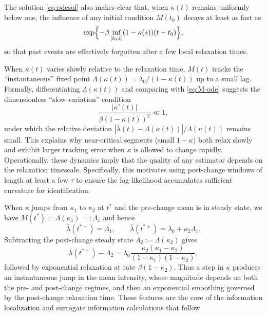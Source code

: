 \documentclass{article}
\theoremstyle{plain}
\theoremstyle{definition}
\newcommand{\1}{\mathbf{1}}
\begin{document}
    
    The solution \eqref{eq:odesol} also makes clear that, when $\kappa(t)$ remains uniformly below one, the influence of any initial condition $M(t_0)$ decays at least as fast as 
    \[
    \exp\Bigl\{-\beta\inf_{[t_0,t]}(1-\kappa(s))(t-t_0)\Bigr\},
    \]
    so that past events are effectively forgotten after a few local relaxation times.
    
    When $\kappa(t)$ varies slowly relative to the relaxation time, $M(t)$ tracks the ``instantaneous'' fixed point $\Lambda(\kappa(t))=\lambda_0/(1-\kappa(t))$ up to a small lag. Formally, differentiating $\Lambda(\kappa(t))$ and comparing with \eqref{eq:M-ode} suggests the dimensionless ``slow-variation'' condition
    \[
    \frac{|\kappa'(t)|}{\beta(1-\kappa(t))^2}\ll 1,
    \]
    under which the relative deviation $|\bar\lambda(t)-\Lambda(\kappa(t))|/\Lambda(\kappa(t))$ remains small. This explains why near-critical segments (small $1-\kappa$) both relax slowly and exhibit larger tracking error when $\kappa$ is allowed to change rapidly. Operationally, these dynamics imply that the quality of any estimator depends on the relaxation timescale. Specifically, this motivates using post-change windows of length at least a few $\tau$ to ensure the log-likelihood accumulates sufficient curvature for identification.%
    
    When $\kappa$ jumps from $\kappa_1$ to $\kappa_2$ at $t^\ast$ and the pre-change mean is in steady state, we have $M(t^\ast)=\Lambda(\kappa_1)=:\Lambda_1$ and hence
    \[
    \bar\lambda(t^{\ast-})=\Lambda_1,\qquad
    \bar\lambda(t^{\ast+})=\lambda_0+\kappa_2\Lambda_1.
    \]
    Subtracting the post-change steady state $\Lambda_2:=\Lambda(\kappa_2)$ gives
    \begin{equation}
    \label{eq:jump-offset}
    \bar\lambda(t^{\ast+})-\Lambda_2
    =\lambda_0 \frac{\kappa_2(\kappa_1-\kappa_2)}{(1-\kappa_1)(1-\kappa_2)},
    \end{equation}
    followed by exponential relaxation at rate $\beta(1-\kappa_2)$. Thus a step in $\kappa$ produces an instantaneous jump in the mean intensity, whose magnitude depends on both the pre- and post-change regimes, and then an exponential smoothing governed by the post-change relaxation time. These features are the core of the information localization and surrogate information calculations that follow.
\end{document}
